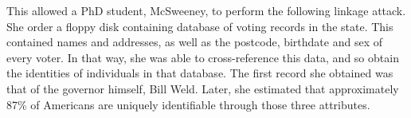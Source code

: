 \begin{frame}
{    This allowed a PhD student, McSweeney, to perform the following
    linkage attack. She order a floppy disk containing database of
    voting records in the state. This contained names and addresses,
    as well as the postcode, birthdate and sex of every voter. In that
    way, she was able to cross-reference this data, and so obtain the
    identities of individuals in that database. The first record she
    obtained was that of the governor himself, Bill Weld. Later, she
    estimated that approximately 87\% of Americans are uniquely
    identifiable through those three attributes.
  }
\end{frame}






